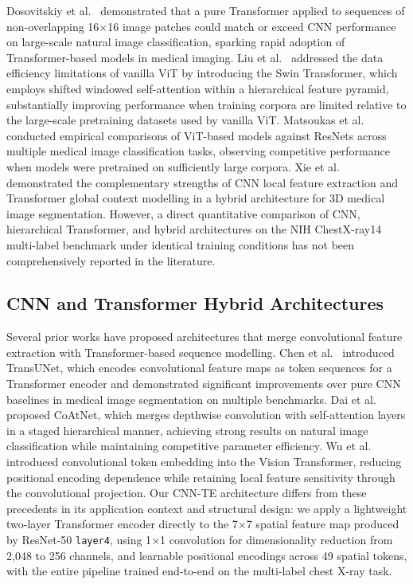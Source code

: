 \documentclass[conference]{IEEEtran}
\begin{document}
Dosovitskiy et al.~\cite{dosovitskiy2021} demonstrated that a pure
Transformer applied to sequences of non-overlapping 16$\times$16 image
patches could match or exceed CNN performance on large-scale natural
image classification, sparking rapid adoption of Transformer-based
models in medical imaging. Liu et al.~\cite{liu2021} addressed the
data efficiency limitations of vanilla ViT by introducing the Swin
Transformer, which employs shifted windowed self-attention within a
hierarchical feature pyramid, substantially improving performance when
training corpora are limited relative to the large-scale pretraining
datasets used by vanilla ViT. Matsoukas et al.~\cite{matsoukas2021}
conducted empirical comparisons of ViT-based models against ResNets
across multiple medical image classification tasks, observing
competitive performance when models were pretrained on sufficiently
large corpora. Xie et al.~\cite{xie2021} demonstrated the
complementary strengths of CNN local feature extraction and Transformer
global context modelling in a hybrid architecture for 3D medical image
segmentation. However, a direct quantitative comparison of CNN,
hierarchical Transformer, and hybrid architectures on the NIH
ChestX-ray14 multi-label benchmark under identical training conditions
has not been comprehensively reported in the literature.

\subsection{CNN and Transformer Hybrid Architectures}

Several prior works have proposed architectures that merge convolutional
feature extraction with Transformer-based sequence modelling. Chen
et al.~\cite{chen2021transUnet} introduced TransUNet, which encodes
convolutional feature maps as token sequences for a Transformer encoder
and demonstrated significant improvements over pure CNN baselines in
medical image segmentation on multiple benchmarks. Dai
et al.~\cite{dai2021coatnet} proposed CoAtNet, which merges depthwise
convolution with self-attention layers in a staged hierarchical manner,
achieving strong results on natural image classification while
maintaining competitive parameter efficiency. Wu et al.~\cite{wu2021cvt}
introduced convolutional token embedding into the Vision Transformer,
reducing positional encoding dependence while retaining local feature
sensitivity through the convolutional projection. Our CNN-TE
architecture differs from these precedents in its application context
and structural design: we apply a lightweight two-layer Transformer
encoder directly to the 7$\times$7 spatial feature map produced by
ResNet-50 \texttt{layer4}, using 1$\times$1 convolution for
dimensionality reduction from 2,048 to 256 channels, and learnable
positional encodings across 49 spatial tokens, with the entire
pipeline trained end-to-end on the multi-label chest X-ray task.
\end{document}
